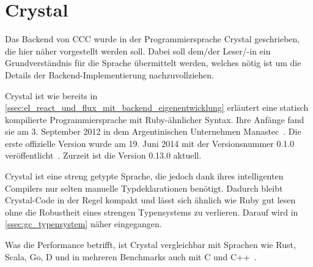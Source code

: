 \section{Crystal}
\label{sec:g_crystal}

Das Backend von CCC wurde in der Programmiersprache Crystal geschrieben, die
hier näher vorgestellt werden soll.  Dabei soll dem/der Leser/-in ein
Grundverständnis für die Sprache übermittelt werden, welches nötig ist um die
Details der Backend-Implementierung nachzuvollziehen.

Crystal ist wie bereits in
\cref{ssec:el_react_und_flux_mit_backend_eigenentwicklung} erläutert eine
statisch kompilierte Programmiersprache mit Ruby-ähnlicher Syntax.  Ihre Anfänge
fand sie am 3. September 2012 in dem Argentinischen Unternehmen
Manastec~\cite{crystalbd}.  Die erste offizielle Version wurde am 19. Juni 2014
mit der Versionsnummer 0.1.0 veröffentlicht~\cite{crystal010}.  Zurzeit ist die
Version 0.13.0 aktuell.

Crystal ist eine streng getypte Sprache, die jedoch dank ihres intelligenten
Compilers nur selten manuelle Typdeklarationen benötigt.  Dadurch bleibt
Crystal-Code in der Regel kompakt und lässt sich ähnlich wie Ruby gut lesen ohne
die Robustheit eines strengen Typensystems zu verlieren.  Darauf wird in
\cref{ssec:gc_typensystem} näher eingegangen.

Was die Performance betrifft, ist Crystal vergleichbar mit Sprachen wie Rust,
Scala, Go, D und in mehreren Benchmarks auch mit C und C++~\cite{benchmarks}.




